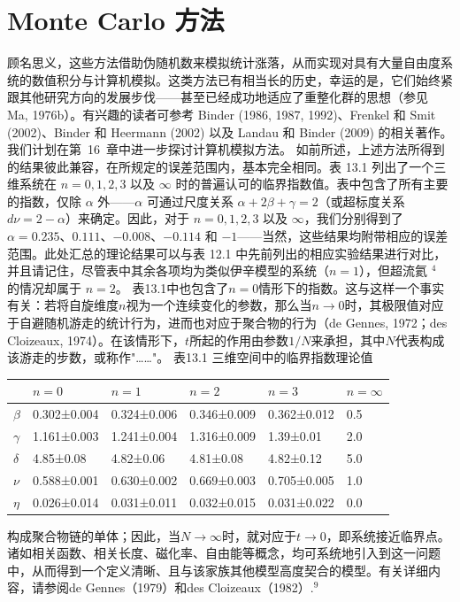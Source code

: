 \section{Monte Carlo 方法}\label{monte-carlo-ux65b9ux6cd5}
顾名思义，这些方法借助伪随机数来模拟统计涨落，从而实现对具有大量自由度系统的数值积分与计算机模拟。这类方法已有相当长的历史，幸运的是，它们始终紧跟其他研究方向的发展步伐——甚至已经成功地适应了重整化群的思想（参见 Ma, 1976b）。有兴趣的读者可参考 Binder (1986, 1987, 1992)、Frenkel 和 Smit (2002)、Binder 和 Heermann (2002) 以及 Landau 和 Binder (2009) 的相关著作。我们计划在第~16~章中进一步探讨计算机模拟方法。
如前所述，上述方法所得到的结果彼此兼容，在所规定的误差范围内，基本完全相同。表 13.1 列出了一个三维系统在 \(n=0,1,2,3\) 以及 \(\infty\) 时的普遍认可的临界指数值。表中包含了所有主要的指数，仅除 \(\alpha\) 外——\(\alpha\) 可通过尺度关系 \(\alpha+2\beta+\gamma=2\)（或超标度关系 \(d\nu=2-\alpha\)）来确定。因此，对于 \(n=0,1,2,3\) 以及 \(\infty\)，我们分别得到了 \(\alpha=0.235\)、\(0.111\)、\(-0.008\)、\(-0.114\) 和 \(-1\)——当然，这些结果均附带相应的误差范围。此处汇总的理论结果可以与表 12.1 中先前列出的相应实验结果进行对比，并且请记住，尽管表中其余各项均为类似伊辛模型的系统（\(n=1\)），但超流氦 \(^{4}\) 的情况却属于 \(n=2\)。
表13.1中也包含了\(n=0\)情形下的指数。这与这样一个事实有关：若将自旋维度\(n\)视为一个连续变化的参数，那么当\(n\to0\)时，其极限值对应于自避随机游走的统计行为，进而也对应于聚合物的行为（de Gennes, 1972；des Cloizeaux, 1974）。在该情形下，\(t\)所起的作用由参数\(1/N\)来承担，其中\(N\)代表构成该游走的步数，或称作"\ldots\ldots"。
表13.1 三维空间中的临界指数理论值
\begin{longtable}[]{@{}llllll@{}}
\toprule\noalign{}
& \(n=0\) & \(n=1\) & \(n=2\) & \(n=3\) & \(n=\infty\) \\
\midrule\noalign{}
\endhead
\bottomrule\noalign{}
\endlastfoot
\(β\) & 0.302±0.004 & 0.324±0.006 & 0.346±0.009 & 0.362±0.012 & 0.5 \\
\(γ\) & 1.161±0.003 & 1.241±0.004 & 1.316±0.009 & 1.39±0.01 & 2.0 \\
\(δ\) & 4.85±0.08 & 4.82±0.06 & 4.81±0.08 & 4.82±0.12 & 5.0 \\
\(ν\) & 0.588±0.001 & 0.630±0.002 & 0.669±0.003 & 0.705±0.005 & 1.0 \\
\(η\) & 0.026±0.014 & 0.031±0.011 & 0.032±0.015 & 0.031±0.022 & 0.0 \\
\end{longtable}
构成聚合物链的单体；因此，当\(N \rightarrow \infty\)时，就对应于\(t \rightarrow 0\)，即系统接近临界点。诸如相关函数、相关长度、磁化率、自由能等概念，均可系统地引入到这一问题中，从而得到一个定义清晰、且与该家族其他模型高度契合的模型。有关详细内容，请参阅de Gennes（1979）和des Cloizeaux（1982）.\(^{9}\)
